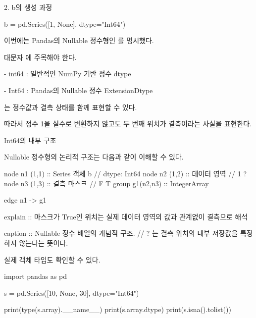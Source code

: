 \begin{dhknote}
\begin{dhksmry}[centered]
2. b의 생성 과정
\end{dhksmry}
\end{dhknote}

\begin{dhkcode}
b = pd.Series([1, None], dtype="Int64")
\end{dhkcode}

이번에는 Pandas의 Nullable 정수형인 를 명시했다.

대문자 에 주목해야 한다.

\begin{dhksmry}
    - int64 : 일반적인 NumPy 기반 정수 dtype

    - Int64 : Pandas의 Nullable 정수 ExtensionDtype
\end{dhksmry}

는 정수값과 결측 상태를 함께 표현할 수 있다.

따라서 정수 1을 실수로 변환하지 않고도 두 번째 위치가 결측이라는 사실을 표현한다.

\begin{dhknote}
\begin{dhksmry}[centered]
Int64의 내부 구조
\end{dhksmry}
\end{dhknote}

Nullable 정수형의 논리적 구조는 다음과 같이 이해할 수 있다.

\begin{dhkgraph}[uniform]
node n1 (1,1) :: Series 객체 b // dtype: Int64
node n2 (1,2) :: 데이터 영역 // 1 ?
node n3 (1,3) :: 결측 마스크 // F T
group g1(n2,n3) :: IntegerArray

edge n1 -> g1

explain :: 마스크가 True인 위치는 실제 데이터 영역의 값과 관계없이 결측으로 해석

caption :: Nullable 정수 배열의 개념적 구조. // ? 는 결측 위치의 내부 저장값을 특정하지 않는다는 뜻이다.
\end{dhkgraph}

실제 객체 타입도 확인할 수 있다.

\begin{dhkcode}
import pandas as pd

s = pd.Series([10, None, 30], dtype="Int64")

print(type(s.array).__name__)
print(s.array.dtype)
print(s.isna().tolist())
\end{dhkcode}

